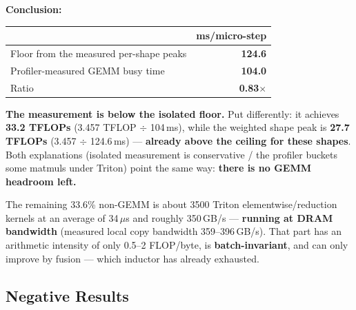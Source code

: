 \textbf{Conclusion:}

\begin{center}\small
\begin{tabular}{@{}lr@{}}
\toprule
 & \textbf{ms/micro-step} \\
\midrule
Floor from the measured per-shape peaks & \textbf{124.6} \\
Profiler-measured GEMM busy time & \textbf{104.0} \\
Ratio & \textbf{0.83$\times$} \\
\bottomrule
\end{tabular}
\end{center}

\textbf{The measurement is below the isolated floor.} Put differently: it achieves
\textbf{33.2 TFLOPs} (3.457 TFLOP $\div$ 104\,ms), while the weighted shape peak is
\textbf{27.7 TFLOPs} (3.457 $\div$ 124.6\,ms) --- \textbf{already above the ceiling for these
shapes}. Both explanations (isolated measurement is conservative / the profiler buckets some
matmuls under Triton) point the same way: \textbf{there is no GEMM headroom left.}

The remaining 33.6\% non-GEMM is about 3500 Triton elementwise/reduction kernels at an average
of 34\,$\mu$s and roughly 350\,GB/s --- \textbf{running at DRAM bandwidth} (measured local copy
bandwidth 359--396\,GB/s). That part has an arithmetic intensity of only 0.5--2 FLOP/byte, is
\textbf{batch-invariant}, and can only improve by fusion --- which inductor has already
exhausted.

\subsection{Negative Results}
\label{sec:en-eng-neg}

